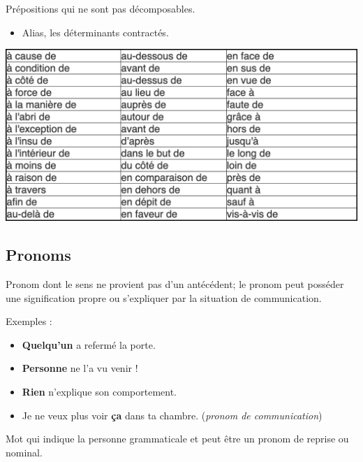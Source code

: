\documentclass[10pt, french]{article}
\begin{document}
\begin{multicols*}{2}
\begin{definitionNOHFILLsub}
Prépositions qui ne sont pas décomposables.
\begin{itemize}
	\item	Alias, les déterminants contractés.
\end{itemize}
\begin{center}
	\includegraphics[width=0.9\columnwidth]{prep-compl}
\end{center}

\end{definitionNOHFILLsub}

\columnbreak
\subsection{Pronoms}
\begin{definitionNOHFILLsub}
Pronom dont le sens ne provient pas d'un antécédent; le pronom peut posséder une signification propre ou s'expliquer par la situation de communication.

\tcbline

Exemples :
\begin{itemize}
	\item	\textbf{Quelqu'un} a refermé la porte.
	\item	\textbf{Personne} ne l'a vu venir !
	\item	\textbf{Rien} n'explique son comportement.
	\item	Je ne veux plus voir \textbf{ça} dans ta chambre. (\textit{pronom de communication})
\end{itemize}
\end{definitionNOHFILLsub}

\begin{definitionNOHFILLsub}
Mot qui indique la personne grammaticale et peut être un pronom de reprise ou nominal.

\tcbline


\end{definitionNOHFILLsub}
\end{multicols*}
\end{document}
